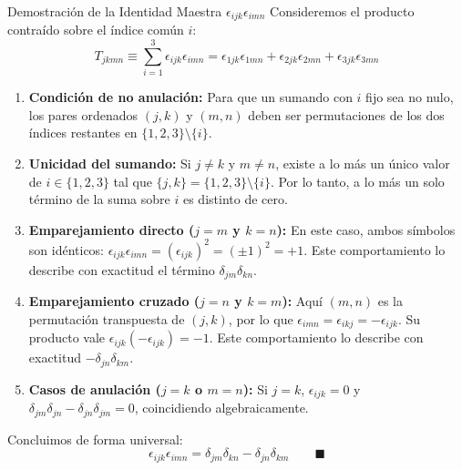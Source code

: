 \documentclass[10pt,aspectratio=169]{beamer}
\begin{document}
\begin{frame}{Demostración de la Identidad Maestra $\epsilon_{ijk}\epsilon_{imn}$}
  \footnotesize
  Consideremos el producto contraído sobre el índice común $i$:
  \[
  T_{jkmn} \equiv \sum_{i=1}^3 \epsilon_{ijk}\epsilon_{imn} = \epsilon_{1jk}\epsilon_{1mn} + \epsilon_{2jk}\epsilon_{2mn} + \epsilon_{3jk}\epsilon_{3mn}
  \]
  \begin{enumerate}
    \itemsep1pt
    \item \textbf{Condición de no anulación:} Para que un sumando con $i$ fijo sea no nulo, los pares ordenados $(j, k)$ y $(m, n)$ deben ser permutaciones de los dos índices restantes en $\{1, 2, 3\} \setminus \{i\}$.
    \item \textbf{Unicidad del sumando:} Si $j \neq k$ y $m \neq n$, existe a lo más un único valor de $i \in \{1, 2, 3\}$ tal que $\{j, k\} = \{1, 2, 3\} \setminus \{i\}$. Por lo tanto, a lo más un solo término de la suma sobre $i$ es distinto de cero.
    \item \textbf{Emparejamiento directo ($j = m$ y $k = n$):} En este caso, ambos símbolos son idénticos: $\epsilon_{ijk}\epsilon_{imn} = (\epsilon_{ijk})^2 = (\pm 1)^2 = +1$. Este comportamiento lo describe con exactitud el término $\delta_{jm}\delta_{kn}$.
    \item \textbf{Emparejamiento cruzado ($j = n$ y $k = m$):} Aquí $(m, n)$ es la permutación transpuesta de $(j, k)$, por lo que $\epsilon_{imn} = \epsilon_{ikj} = -\epsilon_{ijk}$. Su producto vale $\epsilon_{ijk}(-\epsilon_{ijk}) = -1$. Este comportamiento lo describe con exactitud $-\delta_{jn}\delta_{km}$.
    \item \textbf{Casos de anulación ($j = k$ o $m = n$):} Si $j = k$, $\epsilon_{ijk} = 0$ y $\delta_{jm}\delta_{jn} - \delta_{jn}\delta_{jm} = 0$, coincidiendo algebraicamente.
  \end{enumerate}
  Concluimos de forma universal:
  \[
  \boxed{\epsilon_{ijk}\epsilon_{imn} = \delta_{jm}\delta_{kn} - \delta_{jn}\delta_{km}} \qquad \blacksquare
  \]
\end{frame}
\end{document}
